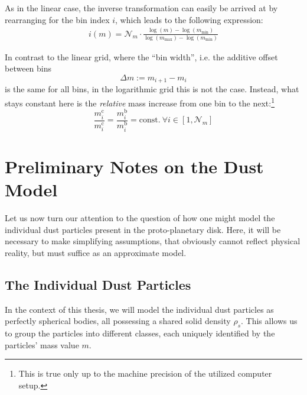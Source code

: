         As in the linear case, the inverse transformation can easily be arrived at by rearranging
        for the bin index $i$, which leads to the following expression:
        \begin{align}
            i(m) = \mathcal N_m\cdot \frac{
                \log(m)-\log(m_\text{min})
            }{
                \log(m_\text{max})-\log(m_\text{min})
            }
        \end{align}
        
        In contrast to the linear grid, where the ``bin width'', i.e. the additive offset between bins
        \begin{equation}
            \Delta m := m_{i+1} - m_i
        \end{equation}
        is the same for all bins, in the logarithmic grid this is not the case. Instead, what stays
        constant here is the \textit{relative} mass increase from one bin to the next:\footnote{This
        is true only up to the machine precision of the utilized computer setup.}
        \begin{equation}
            \frac{m_i^\text{c}}{m_i^\text{c}}
                =\frac{m_i^\text{b}}{m_i^\text{b}}
                =\text{const.}\ \forall i\in[1,\mathcal N_m]
        \end{equation}


\clearpage\section{Preliminary Notes on the Dust Model}
\label{sec:preliminary_notes_on_the_dust_model}

    Let us now turn our attention to the question of how one might model the individual 
    dust particles present in the proto-planetary disk.
    Here, it will be necessary to make simplifying assumptions, that obviously cannot 
    reflect physical reality, but must suffice as an approximate model. \\

    \subsection{The Individual Dust Particles}

        In the context of this thesis, we will model the individual dust particles as perfectly 
        spherical bodies, all possessing a shared solid density $\rho_s$. This allows us to 
        group the particles into different classes, each uniquely identified by the particles' 
        mass value $m$. \\

